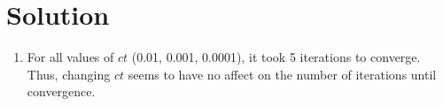 \documentclass[submit]{../harvardml}
\newenvironment{solution}
  {\color{blue}\section*{Solution}}
{}
\begin{document}
\begin{solution}
\begin{enumerate}
\begin{enumerate}
\begin{figure}[htbp]
{              }\hfill
            \end{figure}
            
            \newpage
            \item For all values of $ct$ (0.01, 0.001, 0.0001), it took 5 iterations to converge. Thus, changing $ct$ seems to have no affect on the number of iterations until convergence.
            \begin{figure}[htbp]
              \centering
              \hfill
              \\
\end{figure}
\end{enumerate}
\end{enumerate}
\end{solution}
\end{document}
